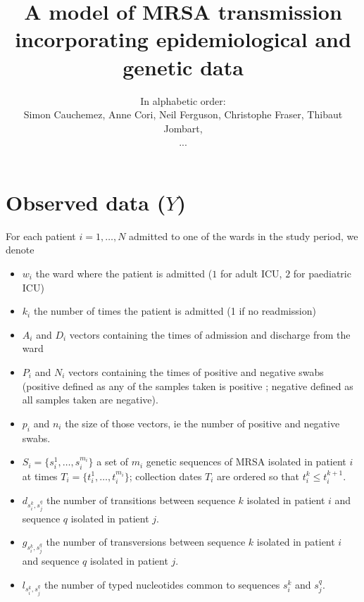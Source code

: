 \documentclass[10pt]{article}
\author{In alphabetic order: \\Simon Cauchemez, Anne Cori, Neil Ferguson, Christophe Fraser, Thibaut Jombart,\\...}
\title{A model of MRSA transmission incorporating epidemiological and genetic data}
\begin{document}
\maketitle

\section*{Observed data ($Y$)}

For each patient $i=1,\ldots,N$ admitted to one of the wards in the study period, we denote 
\begin{itemize}
	\item $w_i$ the ward where the patient is admitted ($1$ for adult ICU, $2$ for paediatric ICU)
	\item $k_i$ the number of times the patient is admitted (1 if no readmission)
	\item $A_i$ and $D_i$ vectors containing the times of admission and discharge from the ward
	\item $P_i$ and $N_i$ vectors containing the times of positive and negative swabs (positive defined as any of the samples taken is positive ; negative defined as all samples taken are negative).
	\item $p_i$ and $n_i$ the size of those vectors, ie the number of positive and negative swabs.
 	\item $S_i = \{s_i^1, \ldots, s_i^{m_i}\}$ a set of $m_i$ genetic sequences of MRSA isolated in patient $i$ at times 
$T_i = \{t_i^1, \ldots, t_i^{m_i}\}$; collection dates $T_i$ are ordered so that $t_i^k \leq t_i^{k+1}$.
 	\item $d_{s_i^k,s_j^q}$ the number of transitions between sequence $k$ isolated in patient $i$ and sequence $q$ isolated in patient $j$.
	\item $g_{s_i^k,s_j^q}$ the number of transversions between sequence $k$ isolated in patient $i$ and sequence $q$ isolated in patient $j$.
	\item $l_{s_i^k,s_j^q}$ the number of typed nucleotides common to sequences $s_i^k$ and $s_j^q$.
\end{itemize}
\end{document}
